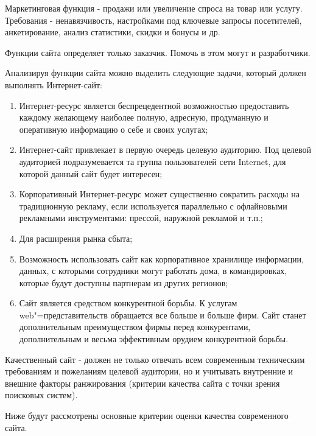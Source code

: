 Маркетинговая функция - продажи или увеличение спроса на товар или услугу.
Требования - ненавязчивость, настройками под ключевые запросы посетителей, анкетирование, анализ статистики, скидки и бонусы и др.

Функции сайта определяет только заказчик. Помочь в этом могут и разработчики.

Анализируя функции сайта можно выделить следующие задачи, который должен выполнять Интернет-сайт:
\begin{enumerate}[label=\arabic*)]
  \item Интернет-ресурс является беспрецедентной возможностью предоставить каждому желающему наиболее полную, адресную, продуманную и оперативную информацию о себе и своих услугах;
  \item Интернет-сайт привлекает в первую очередь целевую аудиторию. Под целевой аудиторией подразумевается та группа пользователей сети Internet, для которой данный сайт будет интересен;
  \item Корпоративный Интернет-ресурс может существенно сократить расходы на традиционную рекламу, если используется параллельно с офлайновыми рекламными инструментами: прессой, наружной рекламой и т.п.;
  \item Для расширения рынка сбыта;
  \item Возможность использовать сайт как корпоративное хранилище информации, данных, с которыми сотрудники могут работать дома, в командировках, которые будут доступны партнерам из других регионов;
  \item Сайт является средством конкурентной борьбы.
  К услугам web"=представительств обращается все больше и больше фирм.
  Сайт станет дополнительным преимуществом фирмы перед конкурентами, дополнительным и весьма эффективным орудием конкурентной борьбы.
\end{enumerate}

Качественный сайт - должен не только отвечать всем современным техническим требованиям и пожеланиям целевой аудитории, но и учитывать внутренние и внешние факторы ранжирования (критерии качества сайта с точки зрения поисковых систем).

Ниже будут рассмотрены основные критерии оценки качества современного сайта.

